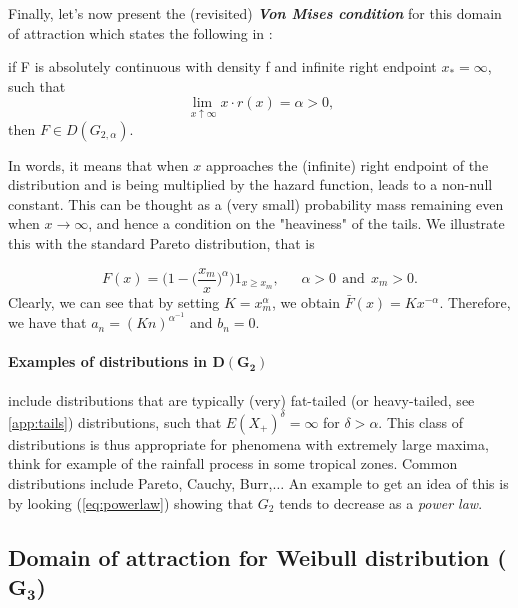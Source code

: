 Finally, let's now present the (revisited) \emph{\textbf{Von Mises condition}} for this domain of attraction which states the following in \cite{falk_von_1993}:

\begin{theorem}
if F is absolutely continuous with density f and infinite right endpoint $x_*=\infty$, such that 
\begin{equation*}
\displaystyle{\lim_{ \ x \uparrow \infty}} x \cdot r(x)=\alpha>0,
\end{equation*}
then $F\in D(G_{2,\alpha})$.
\end{theorem}
In words, it means that when $x$ approaches the (infinite) right endpoint of the distribution and is being multiplied by the hazard function, leads to a non-null constant. This can be thought as a (very small) probability mass remaining even when $x\to\infty$, and hence a condition on the "heaviness" of the tails.
We illustrate this with the standard Pareto distribution, that is 

\begin{equation*}
F(x)=\bigg(1-\big(\frac{x_m}{x}\big)^{\alpha}\bigg)1_{x\geq x_m}, \ \ \ \ \ \ \ \alpha>0 \  \ \text{and} \ \ x_m>0.
\end{equation*}
Clearly, we can see that by setting $K=x_m^{\alpha}$, we obtain $\bar{F}(x)=Kx^{-\alpha}$.
Therefore, we have that $a_n=(Kn)^{\alpha^{-1}}$ and $b_n=0$.

\paragraph*{Examples of distributions in $\boldsymbol{D(G_{2})}$} include distributions that are typically (very) fat-tailed (or heavy-tailed, see \hyperref[app:tails]{\ref{app:tails}}) distributions, such that $E(X_+)^{\delta}=\infty$ for $\delta>\alpha$. This class of distributions is thus appropriate for phenomena with extremely large maxima, think for example of the rainfall process in some tropical zones. Common distributions include Pareto, Cauchy, Burr,$\dots$
An example to get an idea of this is by looking (\ref{eq:powerlaw})
showing that $G_{2}$ tends to decrease as a \emph{power law}.


\subsection*{Domain of attraction for Weibull distribution ($\mathbf{G_{3}}$) }

